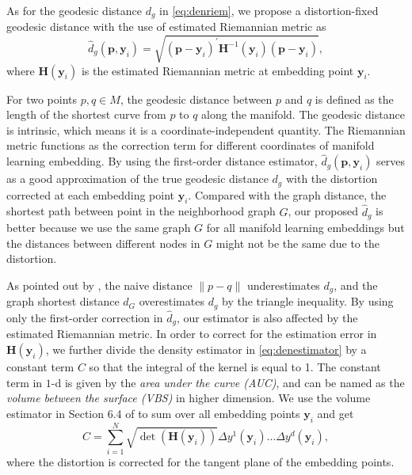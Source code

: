 \documentclass[11pt,a4paper,]{article}
\begin{document}
As for the geodesic distance \(d_g\) in \eqref{eq:denriem}, we propose a distortion-fixed geodesic distance with the use of estimated Riemannian metric as
\begin{equation}
\label{eq:dgestimate}
\hat{d}_g(\pmb{p}, \pmb{y}_i) = \sqrt{(\pmb{p} - \pmb{y}_i)^\prime \pmb{H}^{-1}(\pmb{y}_i) (\pmb{p} - \pmb{y}_i)},
\end{equation}
where \(\pmb{H}(\pmb{y}_i)\) is the estimated Riemannian metric at embedding point \(\pmb{y}_i\).

For two points \(p,q \in M\), the geodesic distance between \(p\) and \(q\) is defined as the length of the shortest curve from \(p\) to \(q\) along the manifold.
The geodesic distance is intrinsic, which means it is a coordinate-independent quantity. The Riemannian metric functions as the correction term for different coordinates of manifold learning embedding.
By using the first-order distance estimator, \(\hat{d}_g(\pmb{p}, \pmb{y}_i)\) serves as a good approximation of the true geodesic distance \(d_g\) with the distortion corrected at each embedding point \(\pmb{y}_i\). Compared with the graph distance, the shortest path between point in the neighborhood graph \(G\), our proposed \(\hat{d}_g\) is better because we use the same graph \(G\) for all manifold learning embeddings but the distances between different nodes in \(G\) might not be the same due to the distortion.

As pointed out by \textcite{Perrault-Joncas2013-pq}, the naive distance \(\|p-q\|\) underestimates \(d_g\), and the graph shortest distance \(d_G\) overestimates \(d_g\) by the triangle inequality. By using only the first-order correction in \(\hat{d}_g\), our estimator is also affected by the estimated Riemannian metric. In order to correct for the estimation error in \(\pmb{H}(\pmb{y}_i)\), we further divide the density estimator in \eqref{eq:denestimator} by a constant term \(C\) so that the integral of the kernel is equal to 1. The constant term in \(1\)-d is given by the \emph{area under the curve (AUC)}, and can be named as the \emph{volume between the surface (VBS)} in higher dimension. We use the volume estimator in Section 6.4 of \textcite{Perrault-Joncas2013-pq} to sum over all embedding points \(\pmb{y}_i\) and get
\begin{equation}
\label{eq:vbs}
C = \sum_{i=1}^{N} \sqrt{\det(\pmb{H}(\pmb{y}_i))} \Delta y^1(\pmb{y}_i)\dots \Delta y^d(\pmb{y}_i),
\end{equation}
where the distortion is corrected for the tangent plane of the embedding points.
\end{document}
